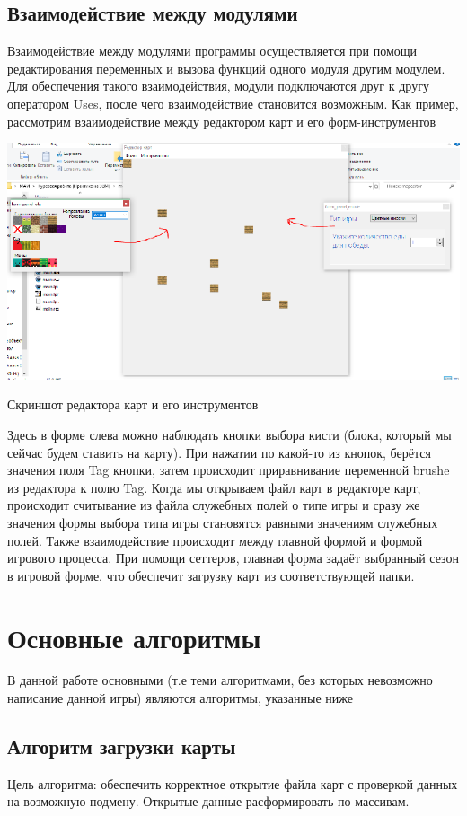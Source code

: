 \documentclass[a4paper,14pt]{extarticle}
\begin{document}
\subsection{Взаимодействие между модулями}
Взаимодействие между модулями программы осуществляется при помощи редактирования переменных и вызова функций одного модуля другим модулем. Для обеспечения такого взаимодействия, модули подключаются друг к другу оператором Uses, после чего взаимодействие становится возможным. Как пример, рассмотрим взаимодействие между редактором карт и его форм-инструментов
\begin{center}
\includegraphics[scale=.9]{img1}

\caption{Скриншот редактора карт и его инструментов}
\end{center}
Здесь в форме слева можно наблюдать кнопки выбора кисти (блока, который мы сейчас будем ставить на карту). При нажатии по какой-то из кнопок, берётся значения поля Tag кнопки, затем происходит приравнивание переменной brushe из редактора к полю Tag. Когда мы открываем файл карт в редакторе карт, происходит считывание из файла служебных полей о типе игры и сразу же значения формы выбора типа игры становятся равными значениям служебных полей. Также взаимодействие происходит между главной формой и формой игрового процесса. При помощи сеттеров, главная форма задаёт выбранный сезон в игровой форме, что обеспечит загрузку карт из соответствующей папки.


\section{Основные алгоритмы}
В данной работе основными (т.е теми алгоритмами, без которых невозможно написание данной игры) являются алгоритмы, указанные ниже
\subsection{Алгоритм загрузки карты}
Цель алгоритма: обеспечить корректное открытие файла карт с проверкой данных на возможную подмену. Открытые данные расформировать по массивам.
\end{document}
